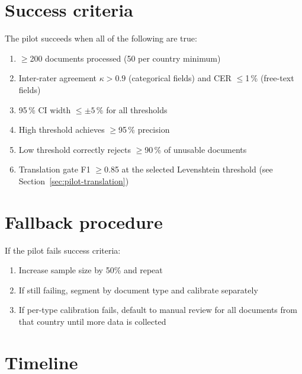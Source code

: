 \section{Success criteria}\label{sec:pilot-success}

The pilot succeeds when all of the following are true:
\begin{enumerate}
  \item $\geq$200 documents processed (50 per country minimum)
  \item Inter-rater agreement $\kappa > 0.9$ (categorical fields)
        and CER $\le$1\,\% (free-text fields)
  \item 95\,\% CI width $\leq \pm 5\,\%$ for all thresholds
  \item High threshold achieves $\geq$95\,\% precision
  \item Low threshold correctly rejects $\geq$90\,\% of unusable documents
  \item Translation gate F1 $\geq$0.85 at the selected Levenshtein
        threshold (see Section~\ref{sec:pilot-translation})
\end{enumerate}

\section{Fallback procedure}

If the pilot fails success criteria:
\begin{enumerate}
  \item Increase sample size by 50\% and repeat
  \item If still failing, segment by document type and calibrate separately
  \item If per-type calibration fails, default to manual review for all
        documents from that country until more data is collected
\end{enumerate}

\section{Timeline}\label{sec:pilot-timeline}

